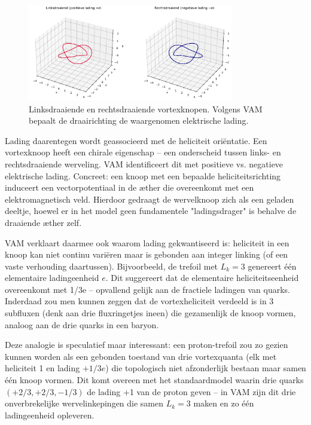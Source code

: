 \begin{figure}[H]
    \centering
    \includegraphics[width=0.8\textwidth]{sections/6_swirlRichting}
    \caption{Linksdraaiende en rechtsdraaiende vortexknopen. Volgens VAM bepaalt de draairichting de waargenomen elektrische lading.}
    \label{fig:swirl_lading}
\end{figure}

Lading daarentegen wordt geassocieerd met de heliciteit oriëntatie. Een vortexknoop heeft een chirale eigenschap – een onderscheid tussen links- en rechtsdraaiende werveling. VAM identificeert dit met positieve vs. negatieve elektrische lading. Concreet: een knoop met een bepaalde heliciteitsrichting induceert een vectorpotentiaal in de æther die overeenkomt met een elektromagnetisch veld. Hierdoor gedraagt de wervelknoop zich als een geladen deeltje, hoewel er in het model geen fundamentele "ladingsdrager" is behalve de draaiende æther zelf.

VAM verklaart daarmee ook waarom lading gekwantiseerd is: heliciteit in een knoop kan niet continu variëren maar is gebonden aan integer linking (of een vaste verhouding daartussen). Bijvoorbeeld, de trefoil met $L_k=3$ genereert één elementaire ladingeenheid $e$. Dit suggereert dat de elementaire heliciteitseenheid overeenkomt met 1/3e – opvallend gelijk aan de fractiele ladingen van quarks. Inderdaad zou men kunnen zeggen dat de vortexheliciteit verdeeld is in 3 subfluxen (denk aan drie fluxringetjes ineen) die gezamenlijk de knoop vormen, analoog aan de drie quarks in een baryon.

Deze analogie is speculatief maar interessant: een proton-trefoil zou zo gezien kunnen worden als een gebonden toestand van drie vortexquanta (elk met heliciteit 1 en lading $+1/3e$) die topologisch niet afzonderlijk bestaan maar samen één knoop vormen. Dit komt overeen met het standaardmodel waarin drie quarks $(+2/3,+2/3,-1/3)$ de lading +1 van de proton geven – in VAM zijn dit drie onverbrekelijke wervelinkepingen die samen $L_k=3$ maken en zo één ladingeenheid opleveren.

